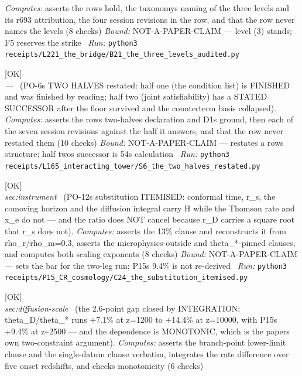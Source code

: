\begin{description}
\emph{Computes:} asserts the rows hold, the taxonomys naming of the three levels and its r693 attribution, the four session revisions in the row, and that the row never names the levels (8 checks)
 \emph{Bound:} NOT-A-PAPER-CLAIM --- level (3) stands; F5 reserves the strike
\ \emph{Run:} \texttt{python3 receipts/L221\_the\_bridge/B21\_the\_three\_levels\_audited.py}
\item[\label{rcpt:S6_the_two_halves_restated}\texttt{S6\_the\_two\_halves\_restated}]\hfill\textsf{[OK]}\\
\textit{---} \ (PO-6s TWO HALVES restated: half one (the condition list) is FINISHED and was finished by reading; half two (joint satisfiability) has a STATED SUCCESSOR after the floor survived and the counterterm basis collapsed). 
\emph{Computes:} asserts the rows two-halves declaration and D1s ground, then each of the seven session revisions against the half it answers, and that the row never restated them (10 checks)
 \emph{Bound:} NOT-A-PAPER-CLAIM --- restates a rows structure; half twos successor is 54s calculation
\ \emph{Run:} \texttt{python3 receipts/L165\_interacting\_tower/S6\_the\_two\_halves\_restated.py}
\item[\label{rcpt:C24_the_substitution_itemised}\texttt{C24\_the\_substitution\_itemised}]\hfill\textsf{[OK]}\\
\textit{sec:instrument} \ (PO-12s substitution ITEMISED: conformal time, r\_s, the comoving horizon and the diffusion integral carry H while the Thomson rate and x\_e do not --- and the ratio does NOT cancel because r\_D carries a square root that r\_s does not). 
\emph{Computes:} asserts the 13\% clause and reconstructs it from rho\_r/rho\_m=0.3, asserts the microphysics-outside and theta\_*-pinned clauses, and computes both scaling exponents (8 checks)
 \emph{Bound:} NOT-A-PAPER-CLAIM --- sets the bar for the two-leg run; P15s 9.4\% is not re-derived
\ \emph{Run:} \texttt{python3 receipts/P15\_CR\_cosmology/C24\_the\_substitution\_itemised.py}
\item[\label{rcpt:C25_the_gap_closed_by_integration}\texttt{C25\_the\_gap\_closed\_by\_integration}]\hfill\textsf{[OK]}\\
\textit{sec:diffusion-scale} \ (the 2.6-point gap closed by INTEGRATION: theta\_D/theta\_* runs +7.1\% at z=1200 to +14.4\% at z=10000, with P15s +9.4\% at z\textasciitilde{}2500 --- and the dependence is MONOTONIC, which is the papers own two-constraint argument). 
\emph{Computes:} asserts the branch-point lower-limit clause and the single-datum clause verbatim, integrates the rate difference over five onset redshifts, and checks monotonicity (6 checks)

\end{description}

